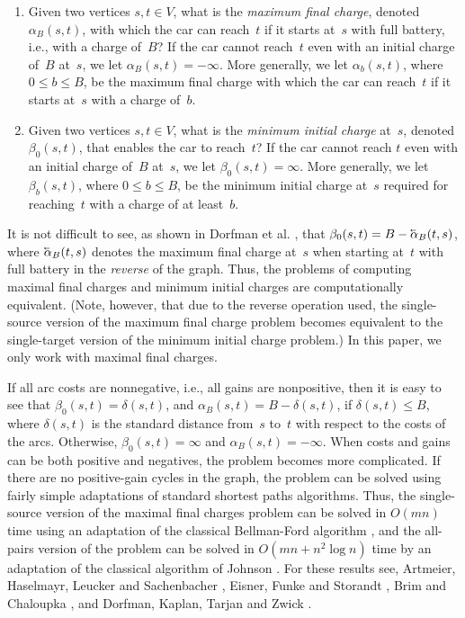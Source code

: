 \documentclass[11pt]{article}
\makeatletter
\newcommand{\cev}[1]{\reflectbox{\ensuremath{\vec{\reflectbox{\ensuremath{#1}}}}}}
\DeclareRobustCommand{\cev}[1]{{\mathpalette\do@cev{#1}}}
\newcommand{\do@cev}[2]{\vbox{\offinterlineskip
    \sbox\z@{$\m@th#1 x$}\ialign{##\cr
      \hidewidth\reflectbox{$\m@th#1\vec{}\mkern4mu$}\hidewidth\cr
      \noalign{\kern-\ht\z@}
      $\m@th#1#2$\cr
    }}}
\makeatother
\begin{document}
\begin{enumerate}[topsep=3pt,left=15pt,itemsep=3pt,parsep=0pt]
    \item Given two vertices $s,t\in V$, what is the \emph{maximum final charge}, denoted $\alpha_B(s,t)$, with which the car can reach~$t$ if it starts at~$s$ with full battery, i.e., with a charge of~$B$? If the car cannot reach~$t$ even with an initial charge of~$B$ at~$s$, we let $\alpha_B(s,t)=-\infty$. More generally, we let $\alpha_b(s,t)$, where $0\le b\le B$, be the maximum final charge with which the car can reach~$t$ if it starts at~$s$ with a charge of~$b$.
    
    \item Given two vertices $s,t\in V$, what is the \emph{minimum initial charge} at~$s$, denoted $\beta_0(s,t)$, that enables the car to reach~$t$? If the car cannot reach $t$ even with an initial charge of~$B$ at~$s$, we let $\beta_0(s,t)=\infty$. More generally, we let $\beta_b(s,t)$, where $0\le b\le B$, be the minimum initial charge at~$s$ required for reaching~$t$ with a charge of at least~$b$.
\end{enumerate}

It is not difficult to see, as shown in Dorfman et al. \cite[Corollary 5.2]{DorfmanKTZ23}, that $\beta_0(s,t)=B-\cev{\alpha}_B(t,s)$, where $\cev{\alpha}_B(t,s)$ denotes the maximum final charge at~$s$ when starting at~$t$ with full battery in the \emph{reverse} of the graph. Thus, the problems of computing maximal final charges and minimum initial charges are computationally equivalent. (Note, however, that due to the reverse operation used, the single-source version of the maximum final charge problem becomes equivalent to the single-target version of the minimum initial charge problem.) In this paper, we only work with maximal final charges.

If all arc costs are nonnegative, i.e., all gains are nonpositive, then it is easy to see that $\beta_0(s,t)=\delta(s,t)$, and $\alpha_B(s,t)=B-\delta(s,t)$, if $\delta(s,t)\le B$, where $\delta(s,t)$ is the standard distance from~$s$ to~$t$ with respect to the costs of the arcs. Otherwise, $\beta_0(s,t)=\infty$ and $\alpha_B(s,t)=-\infty$. When costs and gains can be both positive and negatives, the problem becomes more complicated. If there are no positive-gain cycles in the graph, the problem can be solved using fairly simple adaptations of standard shortest paths algorithms. Thus, the single-source version of the maximal final charges problem can be solved in $O(mn)$ time using an adaptation of the classical Bellman-Ford algorithm \cite{Bellman58,Ford56}, and the all-pairs version of the problem can be solved in $O(mn+n^2\log n)$ time by an adaptation of the classical algorithm of Johnson \cite{Johnson77}. For these results see, Artmeier, Haselmayr, Leucker and Sachenbacher \cite{artmeier2010shortest}, Eisner, Funke and Storandt \cite{EFS11}, Brim and Chaloupka \cite{BrCh12}, and Dorfman, Kaplan, Tarjan and Zwick \cite{DorfmanKTZ23}. 
\end{document}
